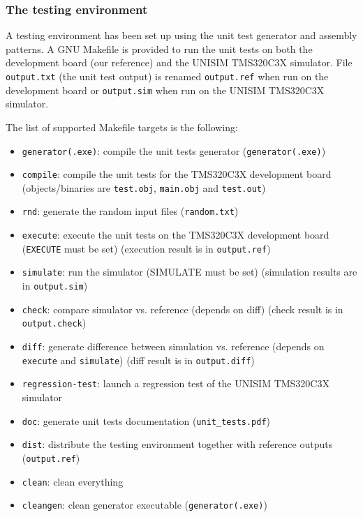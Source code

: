 \newpage
\subsubsection{The testing environment}

A testing environment has been set up using the unit test generator and assembly patterns.
A GNU Makefile is provided to run the unit tests on both the development board (our reference) and the UNISIM TMS320C3X simulator.
File \texttt{output.txt} (the unit test output) is renamed \texttt{output.ref} when run on the development board or \texttt{output.sim} when run on the UNISIM TMS320C3X simulator.

\noindent The list of supported Makefile targets is the following:

\begin{itemize}
\item \texttt{generator(.exe)}: compile the unit tests generator (\texttt{generator(.exe)})
\item \texttt{compile}: compile the unit tests for the TMS320C3X development board (objects/binaries are \texttt{test.obj}, \texttt{main.obj} and \texttt{test.out})
\item \texttt{rnd}: generate the random input files (\texttt{random.txt}) 
\item \texttt{execute}: execute the unit tests on the TMS320C3X development board (\texttt{EXECUTE} must be set) (execution result is in \texttt{output.ref})
\item \texttt{simulate}: run the simulator (SIMULATE must be set) (simulation results are in \texttt{output.sim})                                    
\item \texttt{check}: compare simulator vs. reference (depends on diff) (check result is in \texttt{output.check})
\item \texttt{diff}: generate difference between simulation vs. reference (depends on \texttt{execute} and \texttt{simulate}) (diff result is in \texttt{output.diff})
\item \texttt{regression-test}: launch a regression test of the UNISIM TMS320C3X simulator
\item \texttt{doc}: generate unit tests documentation (\texttt{unit\_tests.pdf})
\item \texttt{dist}: distribute the testing environment together with reference outputs (\texttt{output.ref})
\item \texttt{clean}: clean everything
\item \texttt{cleangen}: clean generator executable (\texttt{generator(.exe)})

\end{itemize}
